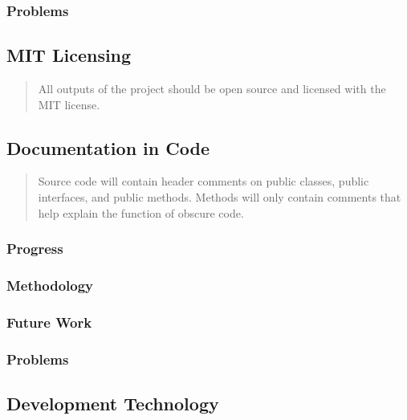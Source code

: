 \documentclass[draftclsnofoot,onecolumn]{IEEEtran}
\begin{document}
\subsubsection{Problems}






\subsection{MIT Licensing}

\begin{quote}

All outputs of the project should be open source and licensed with the MIT license.

\end{quote}






\subsection{Documentation in Code}

\begin{quote}

Source code will contain header comments on public classes, public interfaces, and public methods. Methods will only contain comments that help explain the function of obscure code.

\end{quote}

\subsubsection{Progress}

\subsubsection{Methodology}

\subsubsection{Future Work}

\subsubsection{Problems}






\subsection{Development Technology}
\end{document}
